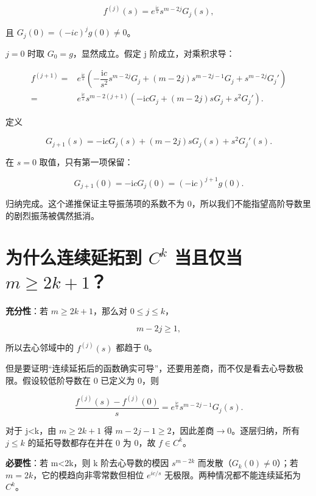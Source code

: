 \[
f^{(j)}(s)
=e^{\frac{\mathrm{i}c}{s}}s^{m-2j}G_j(s),
\]

且 $G_j(0)=(-ic)^j g(0)\ne{}0$。\par

$j=0$ 时取 $G_{0}=g$，显然成立。假定 j 阶成立，对乘积求导：\par

\[
\begin{aligned}
f^{(j+1)}
={}&e^{\frac{\mathrm{i}c}{s}}
\left(
-\dfrac{\mathrm{i}c}{s^2}s^{m-2j}G_j
+(m-2j)s^{m-2j-1}G_j
+s^{m-2j}G_j'
\right)\\
={}&e^{\frac{\mathrm{i}c}{s}}s^{m-2(j+1)}
\left(
-\mathrm{i}cG_j
+(m-2j)sG_j
+s^2G_j'
\right).
\end{aligned}
\]

定义\par

\[
G_{j+1}(s)
=-\mathrm{i}cG_j(s)+(m-2j)sG_j(s)+s^2G_j'(s).
\]

在 $s=0$ 取值，只有第一项保留：\par

\[
G_{j+1}(0)=-\mathrm{i}cG_j(0)
=(-\mathrm{i}c)^{j+1}g(0).
\]

归纳完成。这个递推保证主导振荡项的系数不为 0，所以我们不能指望高阶导数里的剧烈振荡被偶然抵消。\par

\section{为什么连续延拓到 \texorpdfstring{$C^k$}{Ck} 当且仅当 \texorpdfstring{$m\ge 2k+1$}{m >= 2k+1}？}

\textbf{充分性}：若 $m\ge{}2k+1$，那么对 $0\le{}j\le{}k$，\par

\[
m-2j\ge1,
\]

所以去心邻域中的 $f^{(j)}(s)$ 都趋于 0。\par

但是要证明“连续延拓后的函数确实可导”，还要用差商，而不仅是看去心导数极限。假设较低阶导数在 0 已定义为 0，则\par

\[
\dfrac{f^{(j)}(s)-f^{(j)}(0)}{s}
=e^{\frac{\mathrm{i}c}{s}}s^{m-2j-1}G_j(s).
\]

对于 j<k，由 $m\ge{}2k+1$ 得 $m-2j-1\ge{}2$，因此差商$\to{}0$。逐层归纳，所有 $j\le{}k$ 的延拓导数都存在并在 0 为 0，故 $f\in{}C^k$。\par

\textbf{必要性}：若 m<2k，则 k 阶去心导数的模因 $s^{m-2k}$ 而发散（$G_k(0)\ne{}0$）；若 $m=2k$，它的模趋向非零常数但相位 $e^{ic/s}$ 无极限。两种情况都不能连续延拓为 $C^k$。\par

